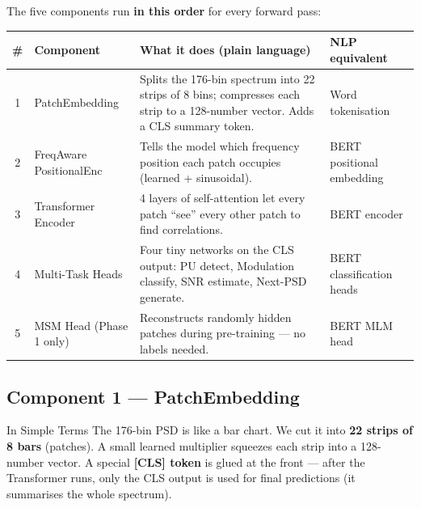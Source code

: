 \documentclass[11pt,a4paper]{article}
\begin{document}
\noindent The five components run \textbf{in this order} for every forward pass:

\smallskip
\begin{center}
\renewcommand{\arraystretch}{1.35}
\begin{tabularx}{\textwidth}{cl X l}
\toprule
\textbf{\#} & \textbf{Component} & \textbf{What it does (plain language)} & \textbf{NLP equivalent} \\
\midrule
1 & PatchEmbedding          & Splits the 176-bin spectrum into 22 strips of 8 bins;
                              compresses each strip to a 128-number vector.
                              Adds a CLS summary token.           & Word tokenisation \\[4pt]
2 & FreqAware PositionalEnc & Tells the model which frequency position each patch
                              occupies (learned + sinusoidal).    & BERT positional embedding \\[4pt]
3 & Transformer Encoder     & 4 layers of self-attention let every patch ``see''
                              every other patch to find correlations.
                                                                 & BERT encoder \\[4pt]
4 & Multi-Task Heads        & Four tiny networks on the CLS output:
                              PU detect, Modulation classify, SNR estimate,
                              Next-PSD generate.                  & BERT classification heads \\[4pt]
5 & MSM Head (Phase 1 only) & Reconstructs randomly hidden patches during
                              pre-training — no labels needed.   & BERT MLM head \\
\bottomrule
\end{tabularx}
\end{center}

\subsection{Component 1 — PatchEmbedding}

\begin{note}{In Simple Terms}
The 176-bin PSD is like a bar chart. We cut it into \textbf{22 strips of
8 bars} (patches). A small learned multiplier squeezes each strip into a
128-number vector. A special \textbf{[CLS] token} is glued at the front
— after the Transformer runs, only the CLS output is used for final
predictions (it summarises the whole spectrum).
\end{note}
\end{document}
